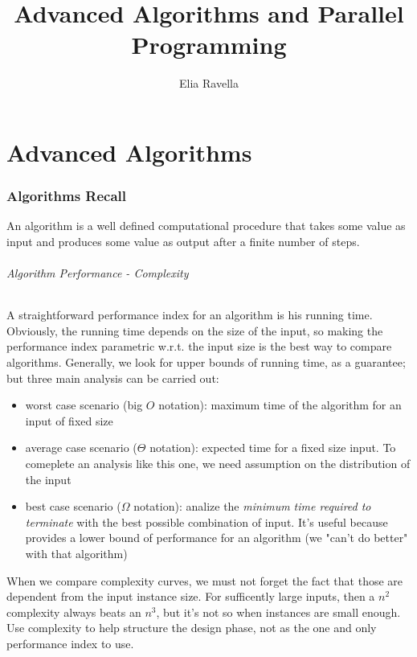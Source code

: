 \documentclass{article}
\title{Advanced Algorithms and Parallel Programming}
\author{Elia Ravella}
\begin{document}
	\begin{titlepage}
		\maketitle
	\end{titlepage}
	
	\tableofcontents
	\clearpage

	\part{Advanced Algorithms}
	\section{Algorithms Recall}
		An algorithm is a well defined computational procedure that takes some value as input and produces some value as output after a finite number of steps.
		
		\paragraph{Algorithm Performance - Complexity}
			A straightforward performance index for an algorithm is his running time. Obviously, the running time depends on the size of the input, so making the performance index parametric w.r.t. the input size is the best way to compare algorithms. Generally, we look for upper bounds of running time, as a guarantee; but three main analysis can be carried out:
			\begin{itemize}
				\item worst case scenario (big $O$ notation): maximum time of the algorithm for an input of fixed size
				\item average case scenario ($\Theta$ notation): expected time for a fixed size input. To comeplete an analysis like this one, we need assumption on the distribution of the input
				\item best case scenario ($\Omega$ notation): analize the \textit{minimum time required to terminate} with the best possible combination of input. It's useful because provides a lower bound of performance for an algorithm (we "can't do better" with that algorithm)
			\end{itemize}
			When we compare complexity curves, we must not forget the fact that those are dependent from the input instance size. For sufficently large inputs, then a $n^2$ complexity always beats an $n^3$, but it's not so when instances are small enough. Use complexity to help structure the design phase, not as the one and only performance index to use.
\end{document}
